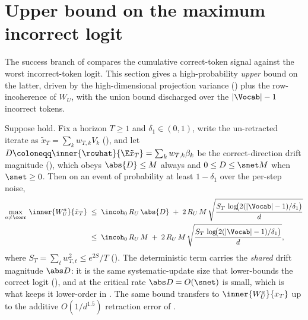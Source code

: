 \section{Upper bound on the maximum incorrect logit}
\label{sec:incorrect_max}

The success branch of  compares the cumulative correct-token
signal against the worst incorrect-token logit. This section gives a
high-probability \emph{upper} bound on the latter, driven by the
high-dimensional projection variance () plus the
row-incoherence of $W_U$, with the union bound discharged over the
$|\Vocab|-1$ incorrect tokens.

\begin{lemma}
\label{lem:incorrect_max}
Suppose  hold. Fix a horizon
$T\ge1$ and $\delta_1\in(0,1)$, write the un-retracted iterate as
$\tilde x_T=\sum_{k} w_{T,k}V_k$ (), and let
$D\coloneqq\inner{\rowhat}{\E\tilde x_T}=\sum_k w_{T,k}\beta_k$ be the
correct-direction drift magnitude (), which obeys
$\abs{D}\le M$ always and $0\le D\le\snet M$ when $\snet\ge0$. Then on an
event of probability at least $1-\delta_1$ over the per-step noise,
\begin{align}\label{eq:incorrect_max_bound}
   \max_{a\neq\corr}\, \inner{W_U^a}{\tilde x_T}
   &\;\le\;
   \incoh_0\, R_U\, \abs{D}
   \;+\;
   2\,R_U\,M\,
   \sqrt{\frac{S_T\,\log\!\bigl(2(|\Vocab|-1)/\delta_1\bigr)}{d}}
   \nonumber\\
   &\;\le\;
   \incoh_0\, R_U\, M
   \;+\;
   2\,R_U\,M\,
   \sqrt{\frac{S_T\,\log\!\bigl(2(|\Vocab|-1)/\delta_1\bigr)}{d}},
\end{align}
where $S_T=\sum_t w_{T,t}^2\le e^{2S}/T$ (). The
deterministic term carries the \emph{shared} drift magnitude $\abs D$: it
is the same systematic-update size that lower-bounds the correct logit
(), and at the critical rate $\abs D=O(\snet)$ is
small, which is what keeps it lower-order in . The same bound
transfers to $\inner{W_U^a}{x_T}$ up to the additive $O(1/d^{1.5})$
retraction error of .
\end{lemma}

